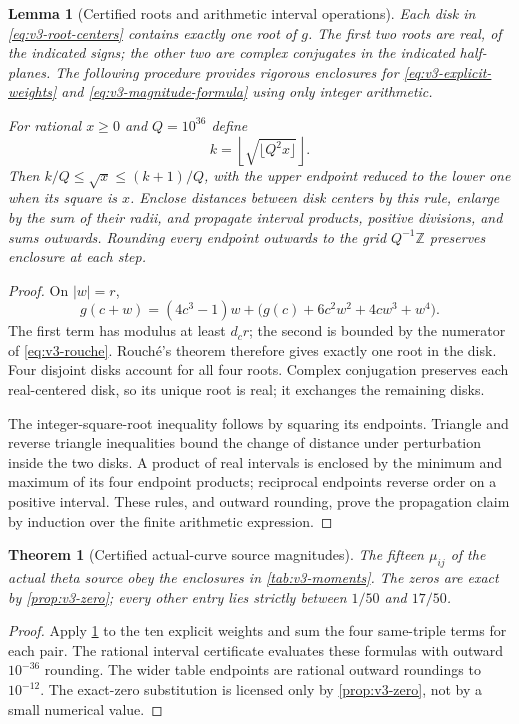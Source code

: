 \documentclass[11pt]{article}
\newtheorem{theorem}{Theorem}[section]
\newtheorem{lemma}[lemma]{Lemma}
\theoremstyle{definition}
\theoremstyle{remark}
\newcommand{\Z}{\mathbb Z}
\begin{document}
\begin{lemma}[Certified roots and arithmetic interval operations]
\label{lem:v3-interval}
Each disk in \eqref{eq:v3-root-centers} contains exactly one root of $g$.
The first two roots are real, of the indicated signs; the other two are
complex conjugates in the indicated half-planes. The following procedure
provides rigorous enclosures for \eqref{eq:v3-explicit-weights} and
\eqref{eq:v3-magnitude-formula} using only integer arithmetic.

For rational $x\ge0$ and $Q=10^{36}$ define
\[
 k=\left\lfloor\sqrt{\lfloor Q^2x\rfloor}\right\rfloor.
\]
Then $k/Q\le\sqrt x\le(k+1)/Q$, with the upper endpoint reduced to the
lower one when its square is $x$. Enclose distances between disk centers
by this rule, enlarge by the sum of their radii, and propagate interval
products, positive divisions, and sums outwards. Rounding every endpoint
outwards to the grid $Q^{-1}\Z$ preserves enclosure at each step.
\end{lemma}
\begin{proof}
On $|w|=r$,
\[
 g(c+w)=(4c^3-1)w+\bigl(g(c)+6c^2w^2+4cw^3+w^4\bigr).
\]
The first term has modulus at least $d_cr$; the second is bounded by the
numerator of \eqref{eq:v3-rouche}. Rouch\'e's theorem therefore gives
exactly one root in the disk. Four disjoint disks account for all four
roots. Complex conjugation preserves each real-centered disk, so its
unique root is real; it exchanges the remaining disks.

The integer-square-root inequality follows by squaring its endpoints.
Triangle and reverse triangle inequalities bound the change of distance
under perturbation inside the two disks. A product of real intervals is
enclosed by the minimum and maximum of its four endpoint products;
reciprocal endpoints reverse order on a positive interval. These rules,
and outward rounding, prove the propagation claim by induction over the
finite arithmetic expression.
\end{proof}

\begin{theorem}[Certified actual-curve source magnitudes]
\label{thm:v3-numbers}
The fifteen $\mu_{ij}$ of the actual theta source obey the enclosures in
\cref{tab:v3-moments}. The zeros are exact by \cref{prop:v3-zero}; every
other entry lies strictly between $1/50$ and $17/50$.
\end{theorem}
\begin{proof}
Apply \cref{lem:v3-interval} to the ten explicit weights and sum the four
same-triple terms for each pair. The rational interval certificate evaluates
these formulas with outward $10^{-36}$ rounding. The wider table endpoints
are rational outward roundings to $10^{-12}$. The exact-zero substitution
is licensed only by \cref{prop:v3-zero}, not by a small numerical value.
\end{proof}
\end{document}
